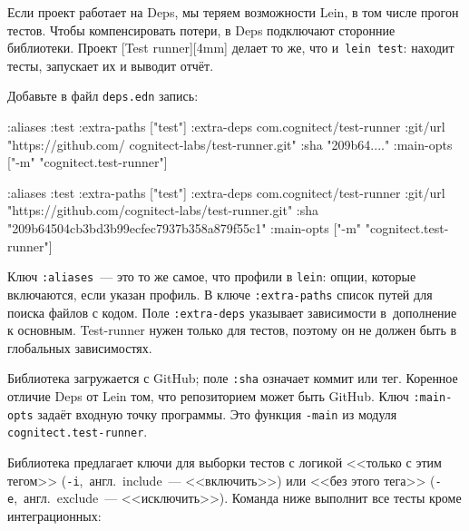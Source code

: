 Если проект работает на Deps, мы теряем возможности Lein, в том числе прогон
тестов. Чтобы компенсировать потери, в Deps подключают сторонние
библиотеки. Проект [Test runner][4mm]
делает то же, что и~\verb|lein test|: находит тесты, запускает их и выводит
отчёт.

Добавьте в файл \verb|deps.edn| запись:

\ifx\devicetype\mobile

\begin{english}
  \begin{clojure}
:aliases
{:test
 {:extra-paths ["test"]
  :extra-deps
  {com.cognitect/test-runner
   {:git/url
    "https://github.com/
         cognitect-labs/test-runner.git"
    :sha "209b64...."}}
  :main-opts
  ["-m" "cognitect.test-runner"]}}
  \end{clojure}
\end{english}

\else

\begin{english}
  \begin{clojure}
:aliases
{:test
 {:extra-paths ["test"]
  :extra-deps
  {com.cognitect/test-runner
   {:git/url "https://github.com/cognitect-labs/test-runner.git"
    :sha "209b64504cb3bd3b99ecfec7937b358a879f55c1"}}
  :main-opts ["-m" "cognitect.test-runner"]}}
  \end{clojure}
\end{english}

\fi


Ключ \verb|:aliases|~--- это то же самое, что профили в \verb|lein|: опции, которые
включаются, если указан профиль. В ключе \verb|:extra-paths| список путей для
поиска файлов с кодом. Поле \verb|:extra-deps| указывает зависимости
в~дополнение к основным. Test-runner нужен только для тестов, поэтому он не
должен быть в глобальных зависимостях.

Библиотека загружается с GitHub; поле \verb|:sha| означает коммит или
тег. Коренное отличие Deps от Lein том, что репозиторием может быть GitHub. Ключ
\verb|:main-opts| задаёт входную точку программы. Это функция \verb|-main|
из модуля \verb|cognitect.test-runner|.

Библиотека предлагает ключи для выборки тестов с логикой <<только с этим тегом>>
(\verb|-i|,~англ.~include~--- <<включить>>) или <<без этого тега>>
(\verb|-e|,~англ.~exclude~--- <<исключить>>). Команда ниже выполнит все тесты кроме
интеграционных:

